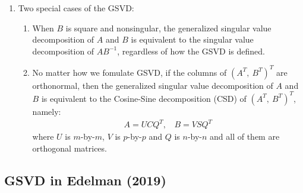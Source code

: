 \begin{enumerate}
\item Two special cases of the GSVD:
            \begin{enumerate}
                \item When $B$ is square and nonsingular, the generalized singular value decomposition of $A$ and $B$ is equivalent to the singular value decomposition of $AB^{-1}$, regardless of how the GSVD is defined.
                
                \item No matter how we fomulate GSVD, if the columns of $(A^T, \ B^T)^T$ are orthonormal, then the generalized singular value decomposition of $A$ and $B$ is equivalent to the Cosine-Sine decomposition (CSD) of $(A^T, \ B^T)^T$, namely:
                \begin{align}
                    A = UCQ^T, \ \ \ \ B = VSQ^T
                \end{align}
                where $U$ is $m$-by-$m$, $V$ is $p$-by-$p$ and $Q$ is $n$-by-$n$ and all of them are orthogonal matrices.
            \end{enumerate}
     \end{enumerate}


\newpage 
\subsection{GSVD in Edelman (2019)} 

